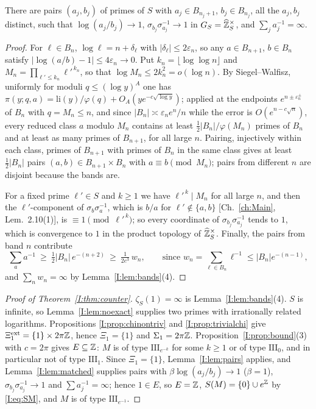 \begin{lemma}\label{I:lem:matched}
There are pairs $(a_j,b_j)$ of primes of $S$ with $a_j\in B_{n_j+1}$, $b_j\in B_{n_j}$, all
the $a_j,b_j$ distinct, such that $\log(a_j/b_j)\to1$, $\sigma_{b_j}\sigma_{a_j}^{-1}\to1$ in
$G_S=\widehat{\mathbb{Z}}_S^\times$, and $\sum_ja_j^{-1}=\infty$.
\end{lemma}

\begin{proof}
For $\ell\in B_n$, $\log\ell=n+\delta_\ell$ with $|\delta_\ell|\le2\varepsilon_n$, so any
$a\in B_{n+1}$, $b\in B_n$ satisfy $|\log(a/b)-1|\le4\varepsilon_n\to0$. Put
$k_n=\lfloor\log\log n\rfloor$ and $M_n=\prod_{\ell'\le k_n}\ell'^{\,k_n}$, so that
$\log M_n\le2k_n^2=o(\log n)$. By Siegel--Walfisz, uniformly for moduli
$q\le(\log y)^{A}$ one has $\pi(y;q,a)=\mathrm{li}(y)/\varphi(q)+O_A(ye^{-c\sqrt{\log y}})$;
applied at the endpoints $e^{n\pm\varepsilon_n^\pm}$ of $B_n$ with $q=M_n\le n$, and since
$|B_n|\asymp\varepsilon_ne^n/n$ while the error is $O(e^{n-c\sqrt n})$, every reduced class
$a$ modulo $M_n$ contains at least $\tfrac12|B_n|/\varphi(M_n)$ primes of $B_n$ and at least
as many primes of $B_{n+1}$, for all large $n$. Pairing, injectively within each class,
primes of $B_{n+1}$ with primes of $B_n$ in the same class gives at least $\tfrac12|B_n|$
pairs $(a,b)\in B_{n+1}\times B_n$ with $a\equiv b\pmod{M_n}$; pairs from different $n$ are
disjoint because the bands are.

For a fixed prime $\ell'\in S$ and $k\ge1$ we have $\ell'^{\,k}\mid M_n$ for all large $n$,
and then the $\ell'$-component of $\sigma_b\sigma_a^{-1}$, which is $b/a$ for
$\ell'\notin\{a,b\}$ [Ch.~\ref{ch:Main}, Lem.~2.10(1)], is $\equiv1\pmod{\ell'^{\,k}}$; so every
coordinate of $\sigma_{b_j}\sigma_{a_j}^{-1}$ tends to $1$, which is convergence to $1$ in
the product topology of $\widehat{\mathbb{Z}}_S^\times$. Finally, the pairs from band $n$ contribute
\[
\sum_{a}a^{-1}\ \ge\ \tfrac12|B_n|\,e^{-(n+2)}\ \ge\ \tfrac1{2e^{3}}\,w_n,
\qquad\text{since } w_n=\sum_{\ell\in B_n}\ell^{-1}\le|B_n|e^{-(n-1)},
\]
and $\sum_nw_n=\infty$ by Lemma~\ref{I:lem:bands}(4).
\end{proof}

\begin{proof}[Proof of Theorem~\ref{I:thm:counter}]
$\zeta_S(1)=\infty$ is Lemma~\ref{I:lem:bands}(4). $S$ is infinite, so
Lemma~\ref{I:lem:noexact} supplies two primes with irrationally related logarithms.
Propositions \ref{I:prop:chinontriv} and \ref{I:prop:trivialchi} give
$\Xi^{\mathrm{ext}}_1=\{1\}\times2\pi\mathbb{Z}$, hence $\Xi_1=\{1\}$ and $\Sigma_1=2\pi\mathbb{Z}$.
Proposition~\ref{I:prop:bound}(3) with $c=2\pi$ gives $E\subseteq\mathbb{Z}$: $M$ is of type
$\mathrm{III}_{e^{-k}}$ for some $k\ge1$ or of type $\mathrm{III}_0$, and in particular not
of type $\mathrm{III}_1$. Since $\Xi_1=\{1\}$, Lemma~\ref{I:lem:pairs} applies, and
Lemma~\ref{I:lem:matched} supplies pairs with $\beta\log(a_j/b_j)\to1$ ($\beta=1$),
$\sigma_{b_j}\sigma_{a_j}^{-1}\to1$ and $\sum a_j^{-1}=\infty$; hence $1\in E$, so $E=\mathbb{Z}$,
$S(M)=\{0\}\cup e^{\mathbb{Z}}$ by \eqref{I:eq:SM}, and $M$ is of type $\mathrm{III}_{e^{-1}}$.
\end{proof}

